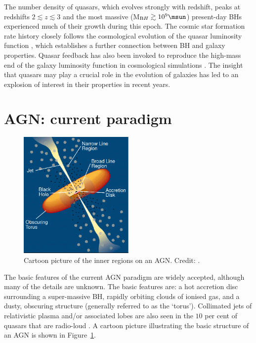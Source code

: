 The number density of quasars, which evolves strongly with redshift, peaks at redshifts $2 \lesssim z \lesssim 3$ \citep[e.g.][]{brandt05,richards06b} and the most massive (M$_{\mathrm BH} \gtrsim 10^9\msun$) present-day BHs experienced much of their growth during this epoch.  
The cosmic star formation rate history closely follows the cosmological evolution of the quasar luminosity function \citep[e.g.][]{boyle98}, which establishes a further connection between BH and galaxy properties.
Quasar feedback has also been invoked to reproduce the high-mass end of the galaxy luminosity function in cosmological simulations \citep[e.g.][]{kauffmann00}.
The insight that quasars may play a crucial role in the evolution of galaxies has led to an explosion of interest in their properties in recent years. 

\section{AGN: current paradigm}

\begin{figure}
  \centering
  \includegraphics[width=0.5\textwidth]{figures/chapter05/urry_model}
  \caption[{Illustration of the physical structure of an AGN in a simple orientation-based unification model.}]{Cartoon picture of the inner regions on an AGN. Credit: \citet{urry95}.}
  \label{fig:agnmodel}
\end{figure}

The basic features of the current AGN paradigm are widely accepted, although many of the details are unknown. 
The basic features are: a hot accretion disc surrounding a super-massive BH, rapidly orbiting clouds of ionised gas, and a dusty, obscuring structure (generally referred to as the `torus'). 
Collimated jets of relativistic plasma and/or associated lobes are also seen in the $10$ per cent of quasars that are radio-loud \citep[e.g.][]{peterson97}. 
A cartoon picture illustrating the basic structure of an AGN is shown in Figure~\ref{fig:agnmodel}. 

